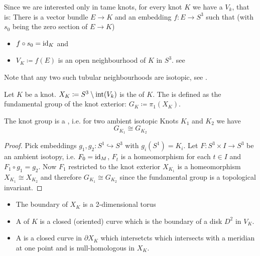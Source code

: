 Since we are interested only in tame knots, for every knot $K$ we have a  $V_k$, that is: There is a vector bundle $E \to K$ and an embedding $f \colon E \to S^3$ such that (with $s_0$ being the zero section of $E \to K$)
\begin{itemize}
	\item $f \circ s_0 = {\operatorname{id}_K}$ and
	\item $V_K \coloneqq f(E)$ is an open neighbourhood of $K$ in $S^3$. \hfill see \textcite{hirschDifferential}
\end{itemize}
Note that any two such tubular neighbourhoods are isotopic, see \textcite[Chap.~4, Thm.~5.3]{hirschDifferential}.

\begin{definition}
	Let $K$ be a knot. $X_K \coloneqq S^3 \setminus \operatorname{int}(V_k)$ is the  of $K$.
	The  is defined as the fundamental group of the knot exterior: $G_K \coloneqq \pi_1(X_K)$.
\end{definition}

\begin{lemma}
	The knot group is a , i.e. for two ambient isotopic Knots $K_1$ and $K_2$ we have
	\[
		G_{K_1} \cong G_{K_2}
	\]
\end{lemma}
\begin{proof}
	Pick embeddings $g_1, g_2 \colon S^1 \hookrightarrow S^3$ with $g_i(S^1)=K_i$.
	Let $F \colon S^3 \times I \to S^3$ be an ambient isotopy, i.e. $F_0 = {\operatorname{id}_M}$, $F_t$ is a homeomorphism for each $t \in I$ and $F_1 \circ g_1 = g_2$.
	Now $F_1$ restricted to the knot exterior $X_{K_1}$ is a homeomorphism $X_{K_1} \cong X_{K_2}$ and therefore $G_{K_1} \cong G_{K_2}$ since the fundamental group is a topological invariant.
\end{proof}

\begin{remark}
	\begin{itemize}
		\item The boundary of $X_K$ is a 2-dimensional torus
		\item A  of $K$ is a closed (oriented) curve which is the boundary of a disk $D^2$ in $V_K$.
		\item A  is a closed curve in $\partial X_K$ which intersetcts which intersects with a meridian at one point and is null-homologous in $X_K$.
	\end{itemize}
\end{remark}

